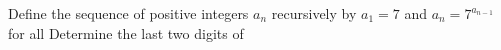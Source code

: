 Deﬁne the sequence of positive integers $a_n$ recursively by $a_1=7$ and $a_n=7^{a_{n-1}}$ for all   Determine the last two digits of 